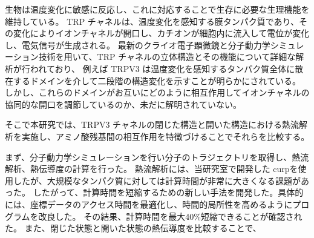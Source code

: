 生物は温度変化に敏感に反応し、これに対応することで生存に必要な生理機能を維持している。
TRP チャネルは、温度変化を感知する膜タンパク質であり、その変化によりイオンチャネルが開口し、カチオンが細胞内に流入して電位が変化し、電気信号が生成される。
最新のクライオ電子顕微鏡と分子動力学シミュレーション技術を用いて、TRP チャネルの立体構造とその機能について詳細な解析が行われており、
例えば TRPV3 は温度変化を感知するタンパク質全体に散在するドメインを介して二段階の構造変化を示すことが明らかにされている。
しかし、これらのドメインがお互いにどのように相互作用してイオンチャネルの協同的な開口を調節しているのか、未だに解明されていない。

そこで本研究では、TRPV3 チャネルの閉じた構造と開いた構造における熱流解析を実施し、アミノ酸残基間の相互作用を特徴づけることでそれらを比較する。

まず、分子動力学シミュレーションを行い分子のトラジェクトリを取得し、熱流解析、熱伝導度の計算を行った。
熱流解析には、当研究室で開発した curpを使用したが、大規模なタンパク質に対しては計算時間が非常に大きくなる課題があった。
したがって、計算時間を短縮するための新しい手法を開発した。具体的には、座標データのアクセス時間を最適化し、時間的局所性を高めるようにプログラムを改良した。
その結果、計算時間を最大40\%短縮できることが確認された。
また、閉じた状態と開いた状態の熱伝導度を比較することで、